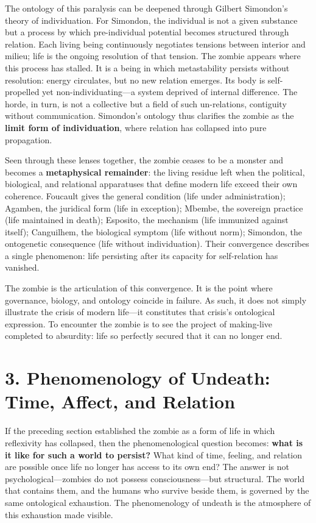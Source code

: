 \documentclass[11pt]{article}
\begin{document}
The ontology of this paralysis can be deepened through Gilbert Simondon’s theory of individuation. For Simondon, the individual is not a given substance but a process by which pre-individual potential becomes structured through relation. Each living being continuously negotiates tensions between interior and milieu; life is the ongoing resolution of that tension. The zombie appears where this process has stalled. It is a being in which metastability persists without resolution: energy circulates, but no new relation emerges. Its body is self-propelled yet non-individuating—a system deprived of internal difference. The horde, in turn, is not a collective but a field of such un-relations, contiguity without communication. Simondon’s ontology thus clarifies the zombie as the \textbf{limit form of individuation}, where relation has collapsed into pure propagation.

Seen through these lenses together, the zombie ceases to be a monster and becomes a \textbf{metaphysical remainder}: the living residue left when the political, biological, and relational apparatuses that define modern life exceed their own coherence. Foucault gives the general condition (life under administration); Agamben, the juridical form (life in exception); Mbembe, the sovereign practice (life maintained in death); Esposito, the mechanism (life immunized against itself); Canguilhem, the biological symptom (life without norm); Simondon, the ontogenetic consequence (life without individuation). Their convergence describes a single phenomenon: life persisting after its capacity for self-relation has vanished.

The zombie is the articulation of this convergence. It is the point where governance, biology, and ontology coincide in failure. As such, it does not simply illustrate the crisis of modern life—it constitutes that crisis’s ontological expression. To encounter the zombie is to see the project of making-live completed to absurdity: life so perfectly secured that it can no longer end.
\section*{3. Phenomenology of Undeath: Time, Affect, and Relation}
\label{sec:org62e6f1e}

If the preceding section established the zombie as a form of life in which reflexivity has collapsed, then the phenomenological question becomes: \textbf{what is it like for such a world to persist?} What kind of time, feeling, and relation are possible once life no longer has access to its own end? The answer is not psychological—zombies do not possess consciousness—but structural. The world that contains them, and the humans who survive beside them, is governed by the same ontological exhaustion. The phenomenology of undeath is the atmosphere of this exhaustion made visible.
\end{document}
